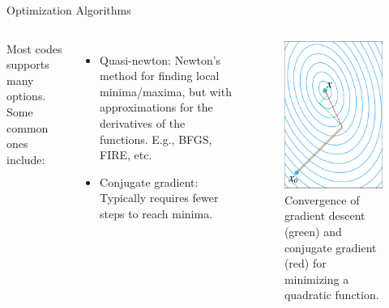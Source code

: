 \documentclass[aspectratio=169]{beamer}
\begin{document}
    \begin{frame}{Optimization Algorithms}

        \begin{columns}
            Most codes supports many options. Some common ones include:
            \begin{itemize}
                \item Quasi-newton: Newton's method for finding local minima/maxima, but with approximations for the derivatives of the functions. E.g., BFGS, FIRE, etc.
                \item Conjugate gradient: Typically requires fewer steps to reach minima.
            \end{itemize}
            \begin{figure}
                \centering
                \includegraphics[width=0.5\linewidth]{lectures/figures/8_conjugate_gradient.png}
                \caption{Convergence of gradient descent (green) and conjugate gradient (red) for minimizing a quadratic function.}
            \end{figure}
        \end{columns}

    \end{frame}
\end{document}
